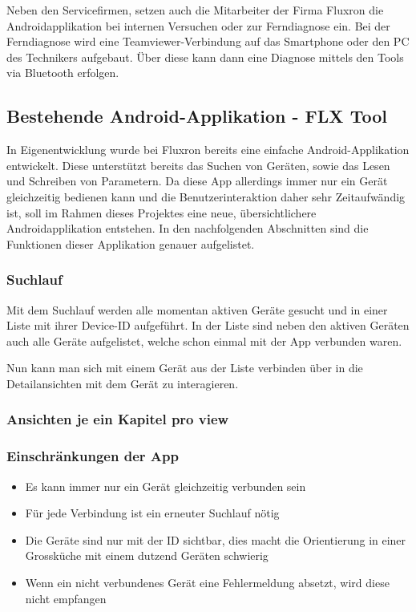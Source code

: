 Neben den Servicefirmen, setzen auch die Mitarbeiter der Firma Fluxron die Androidapplikation bei internen Versuchen oder zur Ferndiagnose ein. Bei der Ferndiagnose wird eine Teamviewer-Verbindung auf das Smartphone oder den PC des Technikers aufgebaut. Über diese kann dann eine Diagnose mittels den Tools via Bluetooth erfolgen.

\subsection{Bestehende Android-Applikation - FLX Tool }
\label{subsec:Bestehende Smartphone-Applikation}
In Eigenentwicklung wurde bei Fluxron bereits eine einfache Android-Applikation entwickelt. Diese unterstützt bereits das Suchen von Geräten, sowie das Lesen und Schreiben von Parametern. Da diese App allerdings immer nur ein Gerät gleichzeitig bedienen kann und die Benutzerinteraktion daher sehr Zeitaufwändig ist, soll im Rahmen dieses Projektes eine neue, übersichtlichere Androidapplikation entstehen. In den nachfolgenden Abschnitten sind die Funktionen dieser Applikation genauer aufgelistet.

\subsubsection{Suchlauf}
\label{subsubsec:Suchlauf}
Mit dem Suchlauf werden alle momentan aktiven Geräte gesucht und in einer Liste mit ihrer Device-ID aufgeführt. In der Liste sind neben den aktiven Geräten auch alle Geräte aufgelistet, welche schon einmal mit der App verbunden waren.

Nun kann man sich mit einem Gerät aus der Liste verbinden über in die Detailansichten mit dem Gerät zu interagieren.

\subsubsection{Ansichten je ein Kapitel pro view}
\label{subsubsec:Ansichten}

\subsubsection{Einschränkungen der App}
\label{subsubsec:Einschränkungen der App}
\begin{itemize}
\item Es kann immer nur ein Gerät gleichzeitig verbunden sein
\item Für jede Verbindung ist ein erneuter Suchlauf nötig
\item Die Geräte sind nur mit der ID sichtbar, dies macht die Orientierung in einer Grossküche mit einem dutzend Geräten schwierig
\item Wenn ein nicht verbundenes Gerät eine Fehlermeldung absetzt, wird diese nicht empfangen
\end{itemize}

